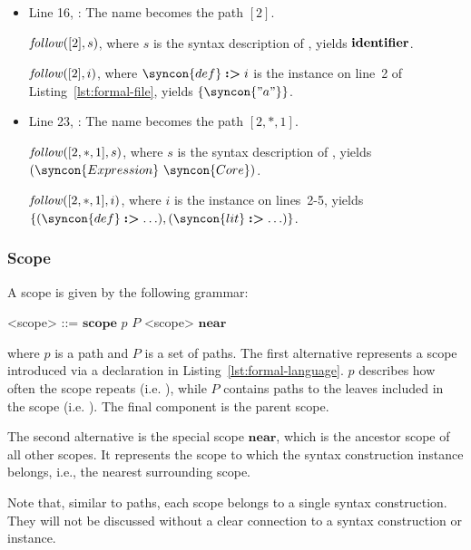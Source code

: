 \documentclass{kththesis}
\begin{document}
\begin{itemize}
  \item Line 16, : The name  becomes the path $[2]$.

  $\mathit{follow}([2], s)$, where $s$ is the syntax description of , yields $\mathrel{\mathbf{identifier}}$.

  $\mathit{follow}([2], i)$, where $\syncon{def} \tagged i$ is the  instance on line~2 of Listing~\ref{lst:formal-file}, yields $\{\syncon{"a"}\}$.

  \item Line 23, : The name  becomes the path $[2, *, 1]$.

  $\mathit{follow}([2, *, 1], s)$, where $s$ is the syntax description of , yields $(\syncon{Expression}\ \syncon{Core})$.

  $\mathit{follow}([2, *, 1], i)$, where $i$ is the  instance on lines~2-5, yields $\{(\syncon{def} \tagged \ldots), (\syncon{lit} \tagged \ldots)\}$.
\end{itemize}

\subsubsection{Scope}

\newcommand{\near}{\ensuremath{\mathrel{\mathbf{near}}}}
\newcommand{\scope}{\ensuremath{\mathrel{\mathbf{scope}}}}

A scope is given by the following grammar:

\begin{grammar}
<scope> ::= $\scope$ $p$ $P$ <scope>
  \alt $\near$
\end{grammar}

where $p$ is a path and $P$ is a set of paths. The first alternative represents a scope introduced via a declaration  in Listing~\ref{lst:formal-language}. $p$ describes how often the scope repeats (i.e. ), while $P$ contains paths to the leaves included in the scope (i.e. ). The final component is the parent scope.

The second alternative is the special scope $\near$, which is the ancestor scope of all other scopes. It represents the scope to which the syntax construction instance belongs, i.e., the nearest surrounding scope.

Note that, similar to paths, each scope belongs to a single syntax construction. They will not be discussed without a clear connection to a syntax construction or instance.
\end{document}
